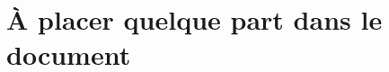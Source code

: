 %
%

\chapter{À placer quelque part dans le document}
\label{a_placer_quelque_part_dans_le_document}

